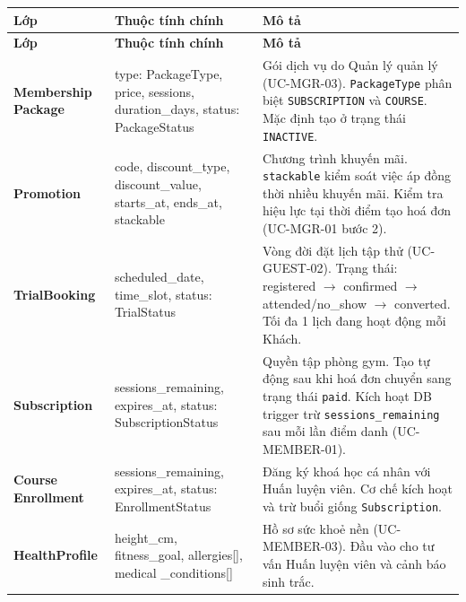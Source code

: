 \begingroup
\renewcommand{\arraystretch}{1.3}
\begin{longtable}{|>{\centering\arraybackslash}m{3.2cm}|>{\ttfamily\raggedright\arraybackslash}m{3.5cm}|>{\raggedright\arraybackslash}m{7.5cm}|}
\hline
\textbf{Lớp} & \normalfont\textbf{Thuộc tính chính} & \textbf{Mô tả} \\ \hline
\endfirsthead
\hline
\textbf{Lớp} & \normalfont\textbf{Thuộc tính chính} & \textbf{Mô tả} \\ \hline
\endhead
\hline
\endfoot

\textbf{Membership Package} &
  type: PackageType, price, sessions, duration\_days,
  status: PackageStatus &
  Gói dịch vụ do Quản lý quản lý (UC-MGR-03). \texttt{PackageType}
  phân biệt \texttt{SUBSCRIPTION} và \texttt{COURSE}. Mặc định
  tạo ở trạng thái \texttt{INACTIVE}. \\ \hline

\textbf{Promotion} &
  code, discount\_type, discount\_value, starts\_at,
  ends\_at, stackable &
  Chương trình khuyến mãi. \texttt{stackable} kiểm soát việc áp đồng
  thời nhiều khuyến mãi. Kiểm tra hiệu lực tại thời điểm tạo hoá đơn
  (UC-MGR-01 bước 2). \\ \hline

\textbf{TrialBooking} &
  scheduled\_date, time\_slot, status: TrialStatus &
  Vòng đời đặt lịch tập thử (UC-GUEST-02). Trạng thái:
  registered $\to$ confirmed $\to$ attended/no\_show
  $\to$ converted. Tối đa 1 lịch đang hoạt động mỗi Khách. \\ \hline

\textbf{Subscription} &
  sessions\_remaining, expires\_at,
  status: SubscriptionStatus &
  Quyền tập phòng gym. Tạo tự động sau khi hoá đơn chuyển sang
  trạng thái \texttt{paid}. Kích hoạt DB trigger trừ \texttt{sessions\_remaining}
  sau mỗi lần điểm danh (UC-MEMBER-01). \\ \hline

\textbf{Course Enrollment} &
  sessions\_remaining, expires\_at,
  status: EnrollmentStatus &
  Đăng ký khoá học cá nhân với Huấn luyện viên. Cơ chế kích hoạt
  và trừ buổi giống \texttt{Subscription}. \\ \hline

\textbf{HealthProfile} &
  height\_cm, fitness\_goal, allergies[], medical \_conditions[] &
  Hồ sơ sức khoẻ nền (UC-MEMBER-03). Đầu vào cho tư vấn
  Huấn luyện viên và cảnh báo sinh trắc. \\ \hline

\end{longtable}
\endgroup

